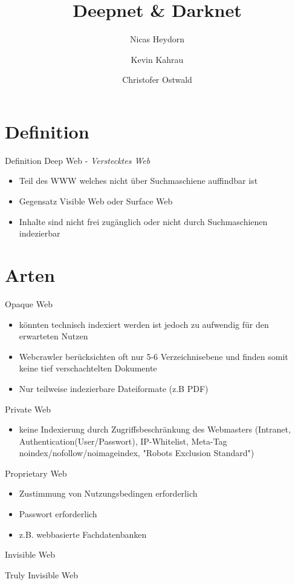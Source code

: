 \documentclass[12pt]{beamer}
\author{Nicas Heydorn \and Kevin Kahrau \and Christofer Ostwald}
\title{Deepnet \& Darknet}
\institute{Nordakademie - Hochschule der Wirtschaft}
\begin{document}
\begin{frame}
\titlepage
\end{frame}

\begin{frame}
\tableofcontents
\end{frame}

\section{Definition}
\begin{frame}{Definition}
	Deep Web - \emph{Verstecktes Web}
	\begin{itemize}
		\item Teil des WWW welches nicht über Suchmaschiene auffindbar ist
		\item Gegensatz Visible Web oder Surface Web
\item Inhalte sind nicht frei zugänglich oder nicht durch Suchmaschienen indezierbar
	\end{itemize}
\end{frame}

\section{Arten}
\begin{frame}{Opaque Web}
	\begin{itemize}
		\item könnten technisch indexiert werden ist jedoch zu aufwendig für den erwarteten Nutzen
		\item Webcrawler berücksichten oft nur 5-6 Verzeichnisebene und finden somit keine tief verschachtelten Dokumente
		\item Nur teilweise indezierbare Dateiformate (z.B PDF)
	\end{itemize}
\end{frame}
\begin{frame}{Private Web}
	\begin{itemize}
		\item keine Indexierung durch Zugriffsbeschränkung des Webmasters (Intranet, Authentication(User/Passwort), IP-Whitelist, Meta-Tag noindex/nofollow/noimageindex, "Robots Exclusion Standard")
	\end{itemize}
\end{frame}
\begin{frame}{Proprietary Web}
	\begin{itemize}
		\item Zustimmung von Nutzungsbedingen erforderlich
		\item Passwort erforderlich
		\item z.B. webbasierte Fachdatenbanken
	\end{itemize}
\end{frame}
\begin{frame}{Invisible Web}
	
\end{frame}
\begin{frame}{Truly Invisible Web}
\end{frame}
\end{document}
